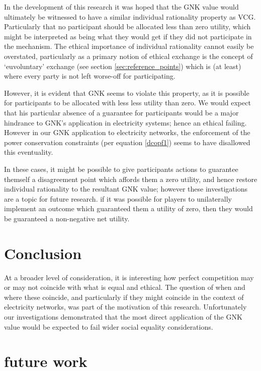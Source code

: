 \documentclass[
10pt, %
a4paper, %
oneside, %
headinclude,footinclude, %
BCOR5mm, %
]{scrartcl}
\begin{document}
In the development of this research it was hoped that the GNK value would ultimately be witnessed to have a similar individual rationality property as VCG.
Particularly that no participant should be allocated less than zero utility, which might be interpreted as being what they would get if they did not participate in the mechanism.
The ethical importance of individual rationality cannot easily be overstated, particularly as a primary notion of ethical exchange is the concept of `euvoluntary' exchange (see section \ref{sec:reference_points}) which is (at least) where every party is not left worse-off for participating.

However, it is evident that GNK seems to violate this property, as it is possible for participants to be allocated with less less utility than zero.
We would expect that his particular absence of a guarantee for participants would be a major hindrance to GNK's application in electricity systems; hence an ethical failing.
However in our GNK application to electricity networks, the enforcement of the power conservation constraints (per equation \ref{dcopf1}) seems to have disallowed this eventuality.

In these cases, it might be possible to give participants actions to guarantee themself a disagreement point which affords them a zero utility, and hence restore individual rationality to the resultant GNK value; however these investigations are a topic for future research.
 if it was possible for players to unilaterally implement an outcome which guaranteed them a utility of zero, then they would be guaranteed a non-negative net utility.


\section{Conclusion}

At a broader level of consideration, it is interesting how perfect competition may or may not coincide with what is equal and ethical.
The question of when and where these coincide, and particularly if they might coincide in the context of electricity networks, was part of the motivation of this research.
Unfortunately our investigations demonstrated that the most direct application of the GNK value would be expected to fail wider social equality considerations.

\section{future work}
\end{document}
